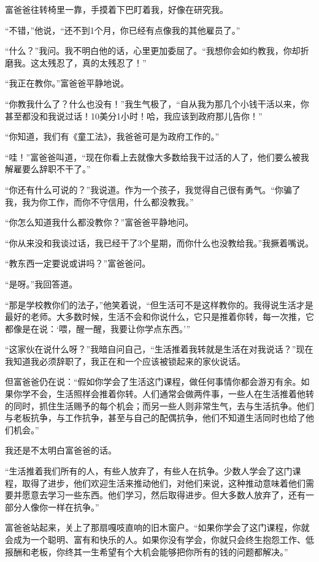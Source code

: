 富爸爸往转椅里一靠，手摸着下巴盯着我，好像在研究我。

“不错，”他说，“还不到1个月，你已经有点像我的其他雇员了。”

“什么？”我问。我不明白他的话，心里更加委屈了。“我想你会如约教我，你却折磨我。这太残忍了，真的太残忍了！”

“我正在教你。”富爸爸平静地说。

“你教我什么了？什么也没有！”我生气极了，“自从我为那几个小钱干活以来，你甚至都没和我说过话！10美分1小时！哈，我应该到政府那儿告你！”

“你知道，我们有《童工法》，我爸爸可是为政府工作的。”

“哇！”富爸爸叫道，“现在你看上去就像大多数给我干过活的人了，他们要么被我解雇要么辞职不干了。”

“你还有什么可说的？”我说道。作为一个孩子，我觉得自己很有勇气。“你骗了我，我为你工作，而你不守信用，什么都没教我。”

“你怎么知道我什么都没教你？”富爸爸平静地问。

“你从来没和我谈过话，我已经干了3个星期，而你什么也没教给我。”我撅着嘴说。

“教东西一定要说或讲吗？”富爸爸问。

“是呀。”我回答道。

“那是学校教你们的法子，”他笑着说，“但生活可不是这样教你的。我得说生活才是最好的老师。大多数时候，生活不会和你说什么，它只是推着你转，每一次推，它都像是在说：‘喂，醒一醒，我要让你学点东西。’”

“这家伙在说什么呀？”我暗自问自己，“生活推着我转就是生活在对我说话？”现在我知道我必须辞职了，我正在和一个应该被锁起来的家伙说话。

但富爸爸仍在说：“假如你学会了生活这门课程，做任何事情你都会游刃有余。如果你学不会，生活照样会推着你转。人们通常会做两件事，一些人在生活推着他转的同时，抓住生活赐予的每个机会；而另一些人则非常生气，去与生活抗争。他们与老板抗争，与工作抗争，甚至与自己的配偶抗争，他们不知道生活同时也给了他们机会。”

我还是不太明白富爸爸的话。

“生活推着我们所有的人，有些人放弃了，有些人在抗争。少数人学会了这门课程，取得了进步，他们欢迎生活来推动他们，对他们来说，这种推动意味着他们需要并愿意去学习一些东西。他们学习，然后取得进步。但大多数人放弃了，还有一部分人像你一样在抗争。”

富爸爸站起来，关上了那扇嘎吱直响的旧木窗户。“如果你学会了这门课程，你就会成为一个聪明、富有和快乐的人。如果你没有学会，你就只会终生抱怨工作、低报酬和老板，你终其一生希望有个大机会能够把你所有的钱的问题都解决。”

